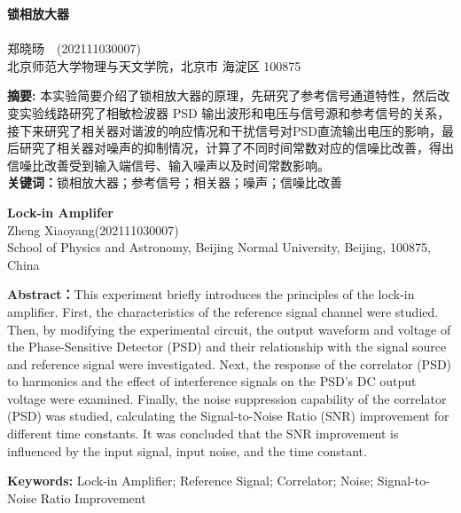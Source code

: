 \documentclass{whureport}
\newcommand{\name}{郑晓旸}
\newcommand{\stuid}{202111030007}
\newcommand{\Name}{Zheng Xiaoyang}
\newcommand{\newtitle}{锁相放大器}
\begin{document}
\pagestyle{maincontent} 


\begin{center}
 \textbf{\newtitle}\\
~\\
 \kaishu \name \ \ (\stuid)\\
 \kaishu 北京师范大学物理与天文学院，北京市 海淀区 100875\\
\end{center}
\textbf{摘\quad 要:}
本实验简要介绍了锁相放大器的原理，先研究了参考信号通道特性，然后改变实验线路研究了相敏检波器 PSD 输出波形和电压与信号源和参考信号的关系，接下来研究了相关器对谐波的响应情况和干扰信号对PSD直流输出电压的影响，最后研究了相关器对噪声的抑制情况，计算了不同时间常数对应的信噪比改善，得出信噪比改善受到输入端信号、输入噪声以及时间常数影响。\\
\textbf{关键词：}锁相放大器；参考信号；相关器；噪声；信噪比改善
~\\
\begin{center}
	 \textbf{Lock-in Amplifer}\\
	 \Name\quad (\stuid)\\
	 School of Physics and Astronomy, Beijing Normal University, Beijing, 100875, China
\end{center}

\textbf{Abstract：}This experiment briefly introduces the principles of the lock-in amplifier. First, the characteristics of the reference signal channel were studied. Then, by modifying the experimental circuit, the output waveform and voltage of the Phase-Sensitive Detector (PSD) and their relationship with the signal source and reference signal were investigated. Next, the response of the correlator (PSD) to harmonics and the effect of interference signals on the PSD's DC output voltage were examined. Finally, the noise suppression capability of the correlator (PSD) was studied, calculating the Signal-to-Noise Ratio (SNR) improvement for different time constants. It was concluded that the SNR improvement is influenced by the input signal, input noise, and the time constant.

\textbf{Keywords: }Lock-in Amplifier; Reference Signal; Correlator; Noise; Signal-to-Noise Ratio Improvement
\end{document}
